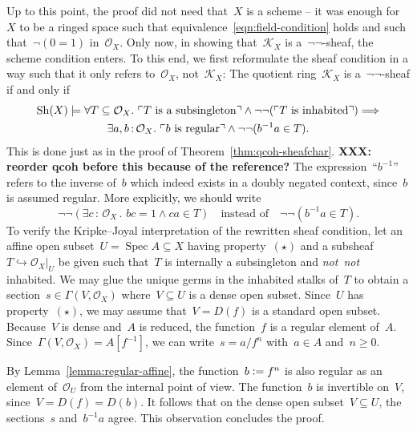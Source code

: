 \documentclass[10pt,reqno,a4paper]{amsbook}
\makeatletter
\theoremstyle{definition}
\theoremstyle{plain}
\theoremstyle{remark}
\renewcommand{\O}{\mathcal{O}}
\newcommand{\K}{\mathcal{K}}
\newcommand{\Sh}{\mathrm{Sh}}
\DeclareMathOperator{\Spec}{Spec}
\newcommand{\?}{\,{:}\,}
\renewcommand{\_}{\mathpunct{.}\,}
\newcommand{\speak}[1]{\ulcorner\text{\textnormal{#1}}\urcorner}
\newcommand{\notnot}{\emph{not~not}\xspace}
\newcommand{\XXX}[1]{\textbf{XXX: #1}}
\newcommand{\defeq}{\vcentcolon=}
\renewenvironment{proof}[1][\proofname]{\par
  \pushQED{\qed}%
  \normalfont \topsep6\p@\@plus6\p@\relax
  \trivlist
  \item[\hskip\labelsep
        \itshape
    #1\@addpunct{.}]\ignorespaces
}{%
  \popQED\endtrivlist\@endpefalse
}
\makeatother
\begin{document}
\begin{proof}
Up to this point, the proof did not need that~$X$ is a scheme -- it was enough
for~$X$ to be a ringed space such that equivalence~\eqref{eqn:field-condition} holds and
such that~$\neg(0 = 1)$ in~$\O_X$. Only now, in showing that~$\K_X$ is
a~$\neg\neg$-sheaf, the scheme condition enters. To this end, we first
reformulate the sheaf condition in a way such that it only refers to~$\O_X$,
not~$\K_X$: The quotient ring~$\K_X$ is a~$\neg\neg$-sheaf if and only if
\begin{multline*}
  \Sh(X) \models \forall T \subseteq \O_X\_
  \speak{$T$ is a subsingleton} \wedge \neg\neg(\speak{$T$ is inhabited})
  \Longrightarrow \\
  \exists a,b\?\O_X\_ \speak{$b$ is regular} \wedge \neg\neg(b^{-1} a \in T).
\end{multline*}
This is done just as in the proof of Theorem~\ref{thm:qcoh-sheafchar}.
\XXX{reorder qcoh before this because of the reference?}
The expression~``$b^{-1}$'' refers to the inverse of~$b$ which indeed exists in a doubly
negated context, since~$b$ is assumed regular. More explicitly, we should write
\[ \neg\neg(\exists c\?\O_X\_ bc = 1 \wedge ca \in T)
  \quad\text{instead of}\quad
  \neg\neg(b^{-1} a \in T). \]
To verify the Kripke--Joyal interpretation of the rewritten sheaf condition, let
an affine open subset~$U = \Spec A \subseteq X$ having property~$(\star)$ and a subsheaf~$T
\hookrightarrow \O_X|_U$ be given such that~$T$ is internally a subsingleton
and \notnot inhabited. We may glue the unique germs in the inhabited
stalks of~$T$ to obtain a section~$s \in \Gamma(V,\O_X)$ where~$V \subseteq U$
is a dense open subset. Since~$U$ has property~$(\star)$, we may assume that~$V
= D(f)$ is a standard open subset. Because~$V$ is dense and~$A$ is reduced, the
function~$f$ is a regular element of~$A$.
Since~$\Gamma(V,\O_X) = A[f^{-1}]$, we can write~$s = a/f^n$ with~$a \in A$
and~$n \geq 0$.

By Lemma~\ref{lemma:regular-affine}, the function~$b \defeq f^n$ is also regular as an
element of~$\O_U$ from the internal point of view. The function~$b$ is invertible
on~$V$, since~$V = D(f) = D(b)$. It follows that on the dense
open subset~$V \subseteq U$, the sections~$s$ and~$b^{-1} a$ agree.
This observation concludes the proof.
\end{proof}
\end{document}
